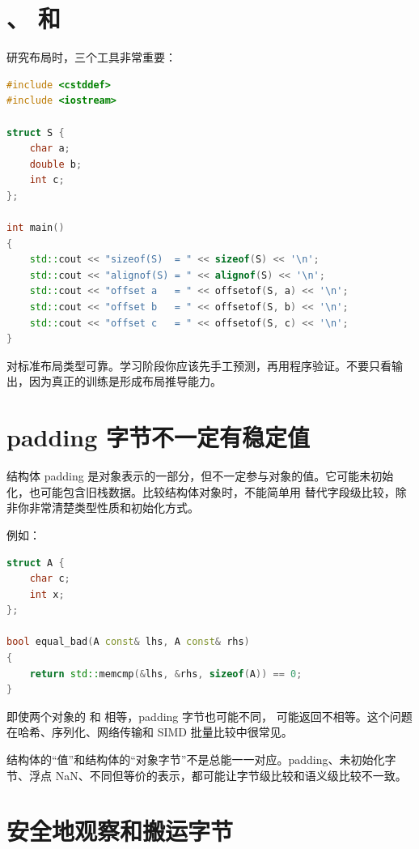 \section{、 和 }

研究布局时，三个工具非常重要：

\begin{lstlisting}[language=C++]
#include <cstddef>
#include <iostream>

struct S {
    char a;
    double b;
    int c;
};

int main()
{
    std::cout << "sizeof(S)  = " << sizeof(S) << '\n';
    std::cout << "alignof(S) = " << alignof(S) << '\n';
    std::cout << "offset a   = " << offsetof(S, a) << '\n';
    std::cout << "offset b   = " << offsetof(S, b) << '\n';
    std::cout << "offset c   = " << offsetof(S, c) << '\n';
}
\end{lstlisting}

 对标准布局类型可靠。学习阶段你应该先手工预测，再用程序验证。不要只看输出，因为真正的训练是形成布局推导能力。

\section{padding 字节不一定有稳定值}

结构体 padding 是对象表示的一部分，但不一定参与对象的值。它可能未初始化，也可能包含旧栈数据。比较结构体对象时，不能简单用  替代字段级比较，除非你非常清楚类型性质和初始化方式。

例如：

\begin{lstlisting}[language=C++]
struct A {
    char c;
    int x;
};

bool equal_bad(A const& lhs, A const& rhs)
{
    return std::memcmp(&lhs, &rhs, sizeof(A)) == 0;
}
\end{lstlisting}

即使两个对象的  和  相等，padding 字节也可能不同， 可能返回不相等。这个问题在哈希、序列化、网络传输和 SIMD 批量比较中很常见。

\begin{warningbox}
结构体的“值”和结构体的“对象字节”不是总能一一对应。padding、未初始化字节、浮点 NaN、不同但等价的表示，都可能让字节级比较和语义级比较不一致。
\end{warningbox}

\section{安全地观察和搬运字节}

